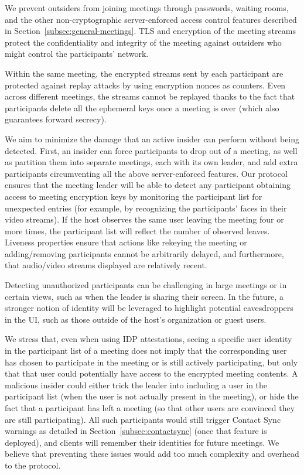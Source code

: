 We prevent outsiders from joining meetings through passwords, waiting rooms, and the other
non-cryptographic server-enforced access control features described in
Section~\ref{subsec:general-meetings}. TLS and encryption of the meeting streams protect the
confidentiality and integrity of the meeting against outsiders who might control the participants'
network.

Within the same meeting, the encrypted streams sent by each participant are protected against replay
attacks by using encryption nonces as counters. Even across different meetings, the streams cannot
be replayed thanks to the fact that participants delete all the ephemeral keys once a meeting is
over (which also guarantees forward secrecy). 

We aim to minimize the damage that an active insider can perform without being detected. First, an
insider can force participants to drop out of a meeting, as well as partition them into separate
meetings, each with its own leader, and add extra participants circumventing all the above
server-enforced features. Our protocol ensures that the meeting leader will be able to detect any
participant obtaining access to meeting encryption keys by monitoring the participant list for
unexpected entries (for example, by recognizing the participants' faces in
their video streams). If the host observes the same user leaving the meeting
four or more times, the participant list will reflect the number of observed
leaves. Liveness properties ensure that actions like rekeying the
meeting or adding/removing participants cannot be arbitrarily delayed, and
furthermore, that audio/video streams displayed are relatively recent.

Detecting unauthorized participants can be challenging in large meetings or in certain views, such
as when the leader is sharing their screen. In the future, a stronger notion of identity will be
leveraged to highlight potential eavesdroppers in the UI, such as those outside of the host's
organization or guest users.

We stress that, even when using IDP attestations, seeing a specific user identity in the participant
list of a meeting does not imply that the corresponding user has chosen to participate in the
meeting or is still actively participating, but only that that user could potentially have access to
the encrypted meeting contents. A malicious insider could either trick the leader into including a
user in the participant list (when the user is not actually present in the meeting), or hide the
fact that a participant has left a meeting (so that other users are convinced they are still
participating). All such participants would still trigger Contact Sync warnings as detailed in
Section~\ref{subsec:contactsync} (once that feature is deployed), and clients will remember their
identities for future meetings. We believe that preventing these issues would add too much
complexity and overhead to the protocol.

